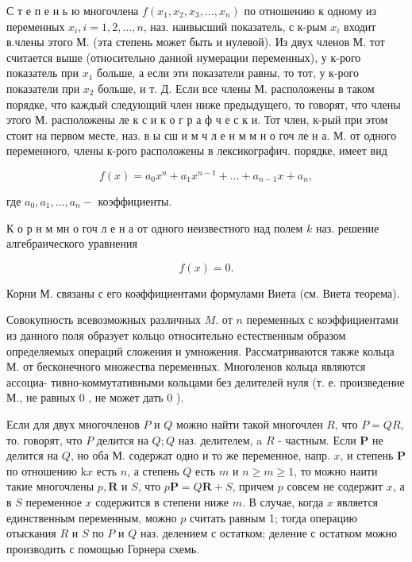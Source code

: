 \documentclass[10pt]{article}
\begin{document}
С т е п е н ь ю многочлена $f\left(x_{1}, x_{2}, x_{3}, \ldots, x_{n}\right)$ по отношению к одному из переменных $x_{i}, i=1,2, \ldots, n$, наз. наивысший показатель, с к-рым $x_{i}$ входит в.члены этого М. (эта степень может быть и нулевой). Из двух членов М. тот считается выше (относительно данной нумерации переменных), у к-рого показатель при $x_{1}$ больше, а если эти показатели равны, то тот, у к-рого показатели при $x_{2}$ больше, и т. Д. Если все члены М. расположены в таком порядке, что каждый следующий член ниже предыдущего, то говорят, что члены этого М. расположены ле к с и к о г р а ф ч е с к и. Тот член, к-рый при этом стоит на первом месте, наз. в ы сш и м ч л е н м м н о гоч ле н а. М. от одного переменного, члены к-рого расположены в лексикографич. порядке, имеет вид



\[

f(x)=a_{0} x^{n}+a_{1} x^{n-1}+\ldots+a_{n-1} x+a_{n},

\]



где $a_{0}, a_{1}, \ldots, a_{n}-$ коэффициенты.



К о р н м мн о гоч л е н а от одного неизвестного над полем $k$ наз. решение алгебраического уравнения



\[

f(x)=0 .

\]



Корни М. связаны с его коәффициентами формулами Виета (см. Виета теорема).



Совокупность всевозможных различных $M$. от $n$ переменных с коэффициентами из данного поля образует кольцо относительно естественным образом определяемых операций сложения и умножения. Рассматриваются также кольца М. от бесконечного множества переменных. Многоленов кольца являются ассоциа- тивно-коммутативными кольцами без делителей нуля (т. е. произведение М., не равных 0 , не может дать 0 ).



Если для двух многочленов $P$ и $Q$ можно найти такой многочлен $R$, что $P=Q R$, то. говорят, что $P$ делится на $Q ; Q$ наз. делителем, a $R$ - частным. Если $\boldsymbol{P}$ не делится на $Q$, но оба М. содержат одно и то же переменное, напр. $x$, и степень $\boldsymbol{P}$ по отношению $\mathrm{k} x$ есть $n$, а степень $Q$ есть $m$ и $n \geqslant m \geqslant 1$, то можно наити такие многочлены $p, \boldsymbol{R}$ и $S$, что $p \boldsymbol{P}=Q \boldsymbol{R}+S$, причем $p$ совсем не содержит $x$, а в $S$ переменное $x$ содержится в степени ниже $m$. В случае, когда $x$ является единственным переменным, можно $p$ считать равным 1; тогда операцию отыскания $R$ и $S$ по $P$ и $Q$ наз. делением с остатком; деление с остатком можно производить с помощью Горнера схемь.
\end{document}
